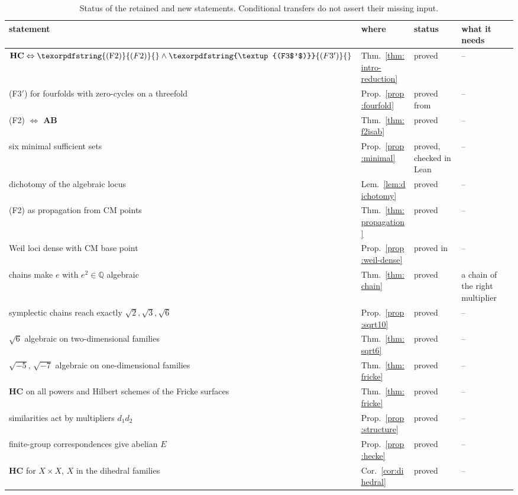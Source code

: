 \documentclass[11pt,reqno]{amsart}
\numberwithin{equation}{section}
\theoremstyle{plain}
\theoremstyle{definition}
\newcommand{\QQ}{\mathbb{Q}}
\newcommand{\HC}{\mathbf{HC}}
\newcommand{\AB}{\mathbf{AB}}
\newcommand{\Fii}{\texorpdfstring{\textup{(F2)}}{(F2)}}
\newcommand{\Fiii}{\texorpdfstring{\textup{(F3$'$)}}{(F3')}}
\begin{document}
\begingroup
\small\setlength{\tabcolsep}{3pt}\setlength{\LTleft}{0pt}\setlength{\LTright}{0pt}
\begin{longtable}{@{}>{\raggedright\arraybackslash}p{}>{\raggedright\arraybackslash}p{}>{\raggedright\arraybackslash}p{}>{\raggedright\arraybackslash}p{}@{}}
\caption{Status of the retained and new statements. Conditional transfers do not assert their missing input.}\label{tab:status}\\
\toprule
statement & where & status & what it needs \\
\midrule
$\HC\Leftrightarrow\Fii{}\wedge\Fiii{}$ & Thm.~\ref{thm:intro-reduction} & proved & -- \\
\Fiii{} for fourfolds with zero-cycles on a threefold & Prop.~\ref{prop:fourfold} & proved from \cite{BS83} & -- \\
\Fii{} $\Leftrightarrow$ $\AB$ & Thm.~\ref{thm:f2isab} & proved & -- \\
six minimal sufficient sets & Prop.~\ref{prop:minimal} & proved, checked in Lean & -- \\
dichotomy of the algebraic locus & Lem.~\ref{lem:dichotomy} & proved & -- \\
\Fii{} as propagation from CM points & Thm.~\ref{thm:propagation} & proved & -- \\
Weil loci dense with CM base point & Prop.~\ref{prop:weil-dense} & proved in \cite{BMB26} & -- \\
chains make $e$ with $e^{2}\in\QQ$ algebraic & Thm.~\ref{thm:chain} & proved & a chain of the right multiplier \\
symplectic chains reach exactly $\sqrt2,\sqrt3,\sqrt6$ & Prop.~\ref{prop:sqrt10} & proved & -- \\
$\sqrt6$ algebraic on two-dimensional families & Thm.~\ref{thm:sqrt6} & proved & -- \\
$\sqrt{-5}$, $\sqrt{-7}$ algebraic on one-dimensional families & Thm.~\ref{thm:fricke} & proved & -- \\
$\HC$ on all powers and Hilbert schemes of the Fricke surfaces & Thm.~\ref{thm:fricke} & proved & -- \\
similarities act by multipliers $d_{1}d_{2}$ & Prop.~\ref{prop:structure} & proved & -- \\
finite-group correspondences give abelian $E$ & Prop.~\ref{prop:hecke} & proved & -- \\
$\HC$ for $X\times X$, $X$ in the dihedral families & Cor.~\ref{cor:dihedral} & proved & -- \\

\end{longtable}
\end{document}

